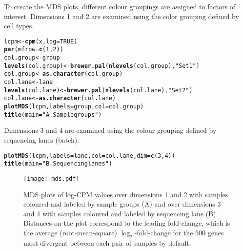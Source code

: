 \documentclass[10pt,a4paper]{extarticle}\usepackage[]{graphicx}\usepackage[]{color}
\makeatletter
\newcommand{\hlnum}[1]{\textcolor[rgb]{0.686,0.059,0.569}{#1}}%
\newcommand{\hlstr}[1]{\textcolor[rgb]{0.192,0.494,0.8}{#1}}%
\newcommand{\hlstd}[1]{\textcolor[rgb]{0.345,0.345,0.345}{#1}}%
\newcommand{\hlkwb}[1]{\textcolor[rgb]{0.69,0.353,0.396}{#1}}%
\newcommand{\hlkwc}[1]{\textcolor[rgb]{0.333,0.667,0.333}{#1}}%
\newcommand{\hlkwd}[1]{\textcolor[rgb]{0.737,0.353,0.396}{\textbf{#1}}}%
\newenvironment{kframe}{%
 \def\at@end@of@kframe{}%
 \ifinner\ifhmode%
  \def\at@end@of@kframe{\end{minipage}}%
  \begin{minipage}{\columnwidth}%
 \fi\fi%
 \def\FrameCommand##1{\hskip\@totalleftmargin \hskip-\fboxsep
 \colorbox{shadecolor}{##1}\hskip-\fboxsep
     \hskip-\linewidth \hskip-\@totalleftmargin \hskip\columnwidth}%
 \MakeFramed {\advance\hsize-\width
   \@totalleftmargin\z@ \linewidth\hsize
   \@setminipage}}%
 {\par\unskip\endMakeFramed%
 \at@end@of@kframe}
\newenvironment{knitrout}{}{} %
\makeatother
\begin{document}
To create the MDS plots, different colour groupings are assigned to factors of interest. Dimensions 1 and 2 are examined using the color grouping defined by cell types. 
\begin{knitrout}
\color{fgcolor}\begin{kframe}
\begin{alltt}
\hlstd{lcpm} \hlkwb{<-} \hlkwd{cpm}\hlstd{(x,} \hlkwc{log}\hlstd{=}\hlnum{TRUE}\hlstd{)}
\hlkwd{par}\hlstd{(}\hlkwc{mfrow}\hlstd{=}\hlkwd{c}\hlstd{(}\hlnum{1}\hlstd{,}\hlnum{2}\hlstd{))}
\hlstd{col.group} \hlkwb{<-} \hlstd{group}
\hlkwd{levels}\hlstd{(col.group)} \hlkwb{<-}  \hlkwd{brewer.pal}\hlstd{(}\hlkwd{nlevels}\hlstd{(col.group),} \hlstr{"Set1"}\hlstd{)}
\hlstd{col.group} \hlkwb{<-} \hlkwd{as.character}\hlstd{(col.group)}
\hlstd{col.lane} \hlkwb{<-} \hlstd{lane}
\hlkwd{levels}\hlstd{(col.lane)} \hlkwb{<-}  \hlkwd{brewer.pal}\hlstd{(}\hlkwd{nlevels}\hlstd{(col.lane),} \hlstr{"Set2"}\hlstd{)}
\hlstd{col.lane} \hlkwb{<-} \hlkwd{as.character}\hlstd{(col.lane)}
\hlkwd{plotMDS}\hlstd{(lcpm,} \hlkwc{labels}\hlstd{=group,} \hlkwc{col}\hlstd{=col.group)}
\hlkwd{title}\hlstd{(}\hlkwc{main}\hlstd{=}\hlstr{"A. Sample groups"}\hlstd{)}
\end{alltt}
\end{kframe}
\end{knitrout}

Dimensions 3 and 4 are examined using the colour grouping defined by sequencing lanes (batch).
\begin{knitrout}
\color{fgcolor}\begin{kframe}
\begin{alltt}
\hlkwd{plotMDS}\hlstd{(lcpm,} \hlkwc{labels}\hlstd{=lane,} \hlkwc{col}\hlstd{=col.lane,} \hlkwc{dim}\hlstd{=}\hlkwd{c}\hlstd{(}\hlnum{3}\hlstd{,}\hlnum{4}\hlstd{))}
\hlkwd{title}\hlstd{(}\hlkwc{main}\hlstd{=}\hlstr{"B. Sequencing lanes"}\hlstd{)}
\end{alltt}
\end{kframe}
\end{knitrout}

\begin{figure}
\centering
\texttt{[image: mds.pdf]}
\caption{\label{fig:MDS}MDS plots of log-CPM values over dimensions 1 and 2 with samples coloured and labeled by sample groups (A) and over dimensions 3 and 4 with samples coloured and labeled by sequencing lane (B). Distances on the plot correspond to the leading fold-change, which is the average (root-mean-square) $\log_2$-fold-change for the 500 genes most divergent between each pair of samples by default.}
\end{figure}
\end{document}
